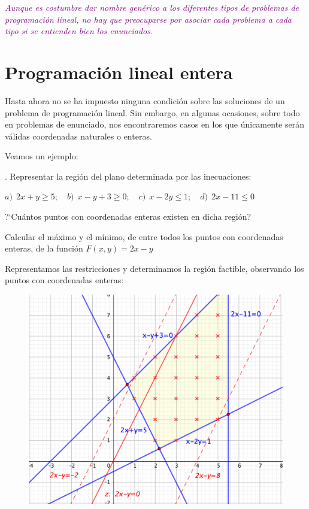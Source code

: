 \begin{destacado}	
\textcolor{purple}{\emph{Aunque es costumbre dar nombre genérico a los diferentes tipos de problemas de programación lineal, no hay que preocuparse por asociar cada problema a cada tipo si se entienden bien los enunciados.}}
\end{destacado}

\vspace{5mm}
\section{Programación lineal entera}
	\vspace{5mm}
	
	
Hasta ahora no se ha impuesto ninguna condición sobre las soluciones de un problema de programación lineal. Sin embargo, en algunas ocasiones, sobre todo en problemas de enunciado, nos encontraremos casos en los que únicamente serán válidas coordenadas naturales o enteras.

Veamos un ejemplo:
	

\vspace{5mm}
\begin{example}
.	Representar la región del plano determinada por las inecuaciones:

$a)\ \ 2x+y\ge 5;\quad b)\ \ x-y+3\ge 0;\quad c)\ \ x-2y\le 1;\quad d)\ \ 2x-11\le 0$

?`Cuántos puntos con coordenadas enteras existen en dicha región?

Calcular el máximo y el mínimo, de entre todos los puntos con coordenadas enteras, de la función $F(x,y)=2x-y$
\end{example}


Representamos las restricciones y determinamos la región factible, observando los puntos con coordenadas enteras:
	
\vspace{4mm}
\begin{figure}[H]
	\centering
	\includegraphics[width=.7\textwidth]{imagenes/img26.png}
\end{figure}
\vspace{4mm}	
	
